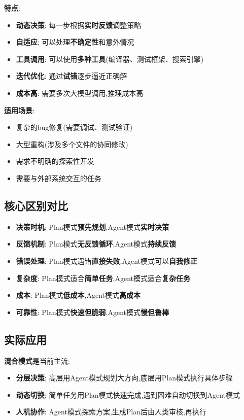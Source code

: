 \documentclass[UTF8]{ctexart}
\begin{document}
\textbf{特点}:
\begin{itemize}
    \item \textbf{动态决策}: 每一步根据\textbf{实时反馈}调整策略
    \item \textbf{自适应}: 可以处理\textbf{不确定性}和意外情况
    \item \textbf{工具调用}: 可以使用\textbf{多种工具}(编译器、测试框架、搜索引擎)
    \item \textbf{迭代优化}: 通过\textbf{试错}逐步逼近正确解
    \item \textbf{成本高}: 需要多次大模型调用,推理成本高
\end{itemize}

\textbf{适用场景}:
\begin{itemize}
    \item 复杂的bug修复(需要调试、测试验证)
    \item 大型重构(涉及多个文件的协同修改)
    \item 需求不明确的探索性开发
    \item 需要与外部系统交互的任务
\end{itemize}

\subsection{核心区别对比}

\begin{itemize}
    \item \textbf{决策时机}: Plan模式\textbf{预先规划},Agent模式\textbf{实时决策}
    \item \textbf{反馈机制}: Plan模式\textbf{无反馈循环},Agent模式\textbf{持续反馈}
    \item \textbf{错误处理}: Plan模式遇错\textbf{直接失败},Agent模式可以\textbf{自我修正}
    \item \textbf{复杂度}: Plan模式适合\textbf{简单任务},Agent模式适合\textbf{复杂任务}
    \item \textbf{成本}: Plan模式\textbf{低成本},Agent模式\textbf{高成本}
    \item \textbf{可靠性}: Plan模式\textbf{快速但脆弱},Agent模式\textbf{慢但鲁棒}
\end{itemize}

\subsection{实际应用}

\textbf{混合模式}是当前主流:
\begin{itemize}
    \item \textbf{分层决策}: 高层用Agent模式规划大方向,底层用Plan模式执行具体步骤
    \item \textbf{动态切换}: 简单任务用Plan模式快速完成,遇到困难自动切换到Agent模式
    \item \textbf{人机协作}: Agent模式探索方案,生成Plan后由人类审核,再执行
\end{itemize}
\end{document}
